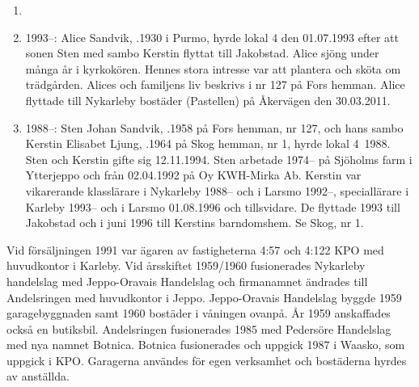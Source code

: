 \begin{enumerate}
  \item {}
  \item 1993--: Alice Sandvik, .1930 i Purmo, hyrde lokal 4 den 01.07.1993 efter att sonen Sten med sambo Kerstin flyttat till Jakobstad. Alice sjöng under många år i kyrkokören. Hennes stora intresse var att plantera och sköta om trädgården. Alices och familjens liv beskrivs i nr 127 på Fors hemman. Alice flyttade till Nykarleby bostäder (Pastellen) på	Åkervägen den 30.03.2011.
  \item 1988--: Sten Johan Sandvik, .1958 på Fors hemman, nr 127, och hans sambo Kerstin Elisabet Ljung, .1964 på Skog hemman, nr 1, hyrde lokal 4 1988. Sten och Kerstin gifte sig 12.11.1994. Sten arbetade 1974-- på Sjöholms farm i Ytterjeppo och från 02.04.1992 på Oy KWH-Mirka Ab. Kerstin var vikarerande klasslärare i Nykarleby 1988-- och i Larsmo 1992--, speciallärare i Karleby 1993-- och i Larsmo 01.08.1996 och tillsvidare. De flyttade 1993 till Jakobstad och i juni 1996 till Kerstins barndomshem. Se Skog, nr 1.
\end{enumerate}


Vid försäljningen 1991 var ägaren av fastigheterna 4:57 och 4:122 KPO med huvudkontor i Karleby. Vid årsskiftet 1959/1960 fusionerades Nykarleby handelslag med Jeppo-Oravais Handelslag och firmanamnet ändrades till Andelsringen med huvudkontor i Jeppo. Jeppo-Oravais Handelslag byggde 1959	garagebyggnaden samt 1960 bostäder i våningen ovanpå. År 1959 anskaffades också en butiksbil. Andelsringen fusionerades 1985 med Pedersöre Handelslag med nya namnet Botnica. Botnica fusionerades och uppgick 1987 i Waasko, som uppgick i KPO. Garagerna användes för egen verksamhet och bostäderna hyrdes av anställda.

